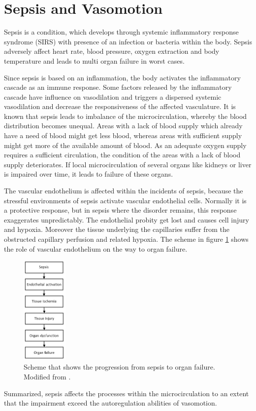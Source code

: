 
\label{chap:sepsis}
\section{Sepsis and Vasomotion}

Sepsis is a condition, which develops through systemic inflammatory response syndrome (SIRS) with presence of an infection or bacteria within the body. Sepsis adversely affect heart rate, blood pressure, oxygen extraction and body temperature and leads to multi organ failure in worst cases.\cite{pluta2010,kanta2014}

Since sepsis is based on an inflammation, the body activates the inflammatory cascade as an immune response. Some factors released by the inflammatory cascade have influence on vasodilation and triggers a dispersed systemic vasodilation and decrease the responsiveness of the affected vasculature. It is known that sepsis leads to imbalance of the microcirculation, whereby the blood distribution becomes unequal. Areas with a lack of blood supply which already have a need of blood might get less blood, whereas areas with sufficient supply might get more of the available amount of blood. As an adequate oxygen supply requires a sufficient circulation, the condition of the areas with a lack of blood supply deteriorates.
If local microcirculation of several organs like kidneys or liver is impaired over time, it leads to failure of these organs.\cite{baudouin2008,kanta2014}

The vascular endothelium is affected within the incidents of sepsis, because the stressful environments of sepsis activate vascular endothelial cells. Normally it is a protective response, but in sepsis where the disorder remains, this response exaggerates unpredictably. The endothelial probity get lost and causes cell injury and hypoxia. Moreover the tissue underlying the capillaries suffer from the obstructed capillary perfusion and related hypoxia. The scheme in figure \ref{fig:Sepsis} shows the role of vascular endothelium on the way to organ failure.\cite{baudouin2008}

\begin{figure}[H]
	\centering	\includegraphics[width=0.2\textwidth]{figures/SepsisEndo}
	\caption{Scheme that shows the progression from sepsis to organ failure. Modified from \cite{baudouin2008}.}
	\label{fig:Sepsis}
\end{figure}

Summarized, sepsis affects the processes within the microcirculation to an extent that the impairment exceed the autoregulation abilities of vasomotion.